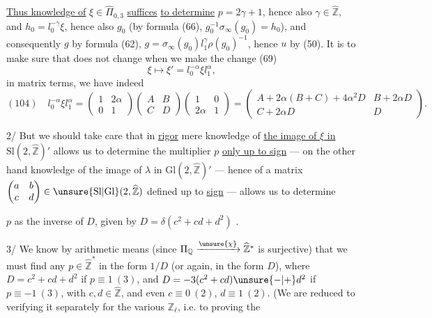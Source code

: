 \uline{Thus knowledge of} $\xi\in\widehat{\Pi}_{0,3}$ \uline{suffices} \uline{to determine}  $p=2\gamma+1$, hence also $\gamma\in\widehat{\mathbb Z}$, and $h_0=l_0^{-\gamma}\xi$, hence also $g_0$ (by formula (66), $g_0^{-1}\sigma_\infty(g_0)=h_0$), and consequently $g$ by formula (62), $g=\sigma_\infty(g_0)l_1^\gamma\rho(g_0)^{-1}$, hence $u$ by (50). It is  to make sure that   does not change when we make the change (69)
\[
\xi\longmapsto\xi'=l_0^{-\alpha}\xi l_1^\alpha,
\]
in matrix terms, we have indeed
\[
(104)\quad l_0^{-\alpha}\xi l_1^\alpha=
\begin{pmatrix}1&2\alpha\\0&1\end{pmatrix}
\begin{pmatrix}A&B\\C&D\end{pmatrix}
\begin{pmatrix}1&0\\2\alpha&1\end{pmatrix}
=\begin{pmatrix}A+2\alpha(B+C)+4\alpha^2D&B+2\alpha D\\C+2\alpha D&D\end{pmatrix}.
\]

2/ But we should take care that in  \uline{rigor} mere knowledge of \uline{the image of $\xi$ in} $\mathrm{Sl}(2,\widehat{\mathbb Z})'$ allows us to determine the multiplier $p$ \uline{only up to sign} --- on the other hand knowledge of the image of $\lambda$ in $\mathrm{Gl}(2,\widehat{\mathbb Z})'$ --- hence of a matrix $\begin{pmatrix}a&b\\c&d\end{pmatrix}\in\unsure{\mathrm{Sl}|\mathrm{Gl}}(2,\widehat{\mathbb Z})$ defined up to \uline{sign} --- allows us to determine


$p$ as the inverse of $D$, given  by $D=\delta(c^2+cd+d^2)$ . 

3/ We know by arithmetic means (since $\Pi_{\mathbb Q}\xrightarrow{\unsure{\chi}}\widehat{\mathbb Z}^{*}$ is surjective) that we must find any $p\in\widehat{\mathbb Z}^{*}$ in the form $1/D$ (or again, in the form $D$), where $D=c^2+cd+d^2$ if $p\equiv1\ (3)$, and $D=-3(c^2+cd)\unsure{-|+}d^2$ if $p\equiv-1\ (3)$, with $c,d\in\widehat{\mathbb Z}$, and even $c\equiv0\ (2)$, $d\equiv1\ (2)$.  (We are reduced to verifying it separately for the various $\mathbb Z_\ell$, i.e. to proving the


